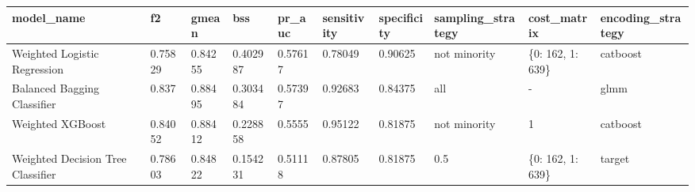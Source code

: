 \begin{tabular}{|l|l|l|l|l|l|l|l|l|l|}
\hline
\textbf{model\_name}              & \textbf{f2} & \textbf{gmean} & \textbf{bss} & \textbf{pr\_auc} & \textbf{sensitivity} & \textbf{specificity} & \textbf{sampling\_strategy} & \textbf{cost\_matrix} & \textbf{encoding\_strategy} \\ \hline
Weighted Logistic Regression      & 0.75829     & 0.84255        & 0.402987     & 0.57617          & 0.78049              & 0.90625              & not minority                & \{0: 162, 1: 639\}    & catboost                    \\ \hline
Balanced Bagging Classifier       & 0.837       & 0.88495        & 0.303484     & 0.57397          & 0.92683              & 0.84375              & all                         & -                     & glmm                        \\ \hline
Weighted XGBoost                  & 0.84052     & 0.88412        & 0.228858     & 0.5555           & 0.95122              & 0.81875              & not minority                & 1                     & catboost                    \\ \hline
Weighted Decision Tree Classifier & 0.78603     & 0.84822        & 0.154231     & 0.51118          & 0.87805              & 0.81875              & 0.5                         & \{0: 162, 1: 639\}    & target                      \\ \hline
\end{tabular}